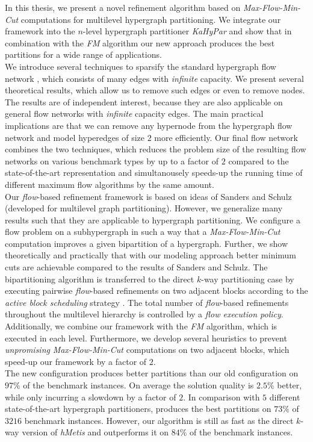 In this thesis, we present a novel refinement algorithm based on \emph{Max-Flow-Min-Cut}
computations for multilevel hypergraph partitioning. We integrate our framework
into the $n$-level hypergraph partitioner \emph{KaHyPar} and show that
in combination with the \emph{FM} algorithm our new approach produces the best partitions
for a wide range of applications.\\
We introduce several techniques to 
sparsify the standard hypergraph flow network \cite{lawler1973},
which consists of many edges with \emph{infinite} capacity. We present
several theoretical results, which allow us to remove such edges or even to remove
nodes. The results are of independent interest, because they are also
applicable on general flow networks with \emph{infinite} capacity edges.
The main practical implications are that we can remove any hypernode 
from the hypergraph flow network and model hyperedges of size $2$ more efficiently. 
Our final flow network combines the two techniques, which reduces 
the problem size of the resulting flow networks on various benchmark types by up to 
a factor of $2$ compared to the state-of-the-art representation and
simultanousely speeds-up the running time of different maximum flow algorithms 
by the same amount.  \\
Our \emph{flow}-based refinement framework is based on ideas of Sanders and Schulz
\cite{sanders2011engineering} (developed for multilevel graph partitioning). However,
we generalize many results such that they are applicable to hypergraph partitioning.
We configure a flow problem on a subhypergraph in such a way that a \emph{Max-Flow-Min-Cut}
computation improves a given bipartition of a hypergraph. Further, we show theoretically
and practically that with our modeling approach better minimum cuts are achievable
compared to the results of Sanders and Schulz. The bipartitioning algorithm is transferred
to the direct $k$-way partitioning case by executing pairwise \emph{flow}-based refinements
on two adjacent blocks according to the \emph{active block scheduling} strategy \cite{holtgrewe2010engineering}.
The total number of \emph{flow}-based refinements throughout the multilevel hierarchy
is controlled by a \emph{flow execution policy}. Additionally, we combine our framework
with the \emph{FM} algorithm, which is executed in each level. Furthermore,
we develop several heuristics to prevent \emph{unpromising} \emph{Max-Flow-Min-Cut}
computations on two adjacent blocks, which speed-up our framework
by a factor of $2$. \\
The new configuration  produces better partitions than our old 
configuration  on $97\%$ of the benchmark instances. On average the solution 
quality is $2.5\%$ better, while only incurring a slowdown by a factor of $2$. 
In comparison with $5$ different state-of-the-art hypergraph partitioners,  
produces the best partitions  on $73\%$ of $3216$ benchmark instances. 
However, our algorithm is still as fast as the direct $k$-way
version of \emph{hMetis} and outperforms it on $84\%$ of the benchmark instances.


